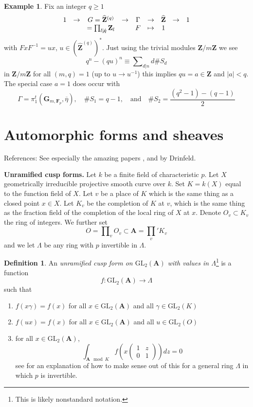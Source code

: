 \documentclass{stacks-project}
\theoremstyle{plain}
\theoremstyle{definition}
\newtheorem{definition}[subsection]{Definition}
\newtheorem{example}[subsection]{Example}
\theoremstyle{remark}
\numberwithin{equation}{subsection}
\begin{document}
\begin{example}
\label{example-commutative}
Fix an integer $q\geq 1$
$$
\begin{matrix}
1 &
\to &
G = \widehat{\mathbf{Z}}^{(q)} &
\to &
\Gamma &
\to &
\widehat{\mathbf{Z}} &
\to &
1 \\
&
&
= \prod_{l\not \mid q} \mathbf{Z}_l &
&
F &
\mapsto &
1
\end{matrix}
$$
with $FxF^{-1} = ux$, $u \in (\widehat{\mathbf{Z}}^{(q)})^*$.
Just using the trivial modules
$\mathbf{Z}/m\mathbf{Z}$ we see
$$
q^n - (qu)^n \equiv \sum\nolimits_{d|n} d\# S_d
$$
in $\mathbf{Z}/m\mathbf{Z}$ for all $(m, q)=1$ (up to
$u \to u^{-1}$) this implies $qu = a\in \mathbf{Z}$
and $|a| < q$. The special case $a = 1$ does occur with
$$
\Gamma = \pi_1^t(\mathbf{G}_{m, \mathbf{F}_p}, \overline \eta),
\quad
\# S_1 = q - 1,
\quad\text{and}\quad
\# S_2 = \frac{(q^2-1)-(q-1)}{2}
$$
\end{example}



\section{Automorphic forms and sheaves}
\label{section-automorphic}

\noindent
References: See especially the amazing papers
\cite{D1}, \cite{D2} and \cite{D0} by Drinfeld.

\medskip\noindent
{\bf Unramified cusp forms.}
Let $k$ be a finite field of characteristic $p$.
Let $X$ geometrically irreducible projective smooth curve over $k$.
Set $K = k(X)$ equal to the function field of $X$.
Let $v$ be a place of $K$ which is the same thing as a
closed point $x\in X$. Let $K_v$ be the completion of $K$ at $v$, which
is the same thing as the fraction field of the completion of
the local ring of $X$ at $x$.
Denote $O_v\subset K_v$ the ring of integers. We further set
$$
O = \prod\nolimits_v O_v \subset \mathbf{A} = \prod_v' K_v
$$
and we let $\Lambda$ be any ring with $p$ invertible in $\Lambda$.

\begin{definition}
\label{definition-unramified}
An {\it unramified cusp form on $\text{GL}_2(\mathbf{A})$ with values in
$\Lambda$}\footnote{This is likely nonstandard notation.}
is a function
$$
f : \text{GL}_2(\mathbf{A}) \to \Lambda
$$
such that
\begin{enumerate}
\item $f(x\gamma) = f(x)$ for all $x\in \text{GL}_2(\mathbf{A})$ and all
$\gamma\in \text{GL}_2(K)$
\item $f(ux) = f(x)$ for all $x\in \text{GL}_2(\mathbf{A})$ and all
$u\in \text{GL}_2(O)$
\item for all $x\in \text{GL}_2(\mathbf{A})$,
$$
\int_{\mathbf{A} \mod K} f
\left(x
\left(
\begin{matrix}
1 & z \\
0 & 1
\end{matrix}
\right)
\right) dz = 0
$$
see \cite[Section 4.1]{dJ-conjecture}
for an explanation of how to make sense out
of this for a general ring $\Lambda$ in which $p$ is invertible.
\end{enumerate}
\end{definition}
\end{document}
